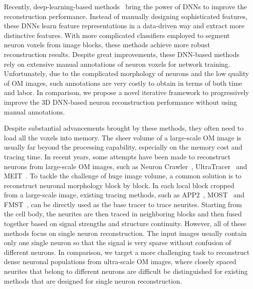Recently, deep-learning-based methods~\cite{Li2017, Zhou2018, Xu2016,Kozinski-MIA2020} bring the power of DNNs to improve the reconstruction performance. 
Instead of manually designing sophisticated features, these DNNs learn feature representations in a data-driven way and extract more distinctive features. 
With more complicated classifiers employed to segment neuron voxels from image blocks, these methods achieve more robust reconstruction results. 
Despite great improvements, these DNN-based methods rely on extensive manual annotations of neuron voxels for network training.
Unfortunately, due to the complicated morphology of neurons and the low quality of OM images, such annotations are very costly to obtain in terms of both time and labor.
%
In comparison, we propose a novel iterative framework to progressively improve the 3D DNN-based neuron reconstruction performance without using manual annotations.



Despite substantial advancements brought by these methods, they often need to load all the voxels into memory.
The sheer volume of a large-scale OM image is usually far beyond the processing capability, especially on the memory cost and tracing time.
%
In recent years, some attempts have been made to reconstruct neurons from large-scale OM images, such as Neuron Crawler~\cite{Zhou2015}, UltraTracer~\cite{Peng2017} and MEIT~\cite{Wang2018}.
To tackle the challenge of huge image volume, a common solution is to reconstruct neuronal morphology block by block. 
In each local block cropped from a large-scale image, existing tracing methods, such as APP2~\cite{Xiao2013}, MOST~\cite{Wu2014} and FMST~\cite{Yang2019}, can be directly used as the base tracer to trace neurites. 
Starting from the cell body, the neurites are then traced in neighboring blocks and then fused together based on signal strengths and structure continuity.
%
However, all of these methods focus on single neuron reconstruction.
The input images usually contain only one single neuron so that the signal is very sparse without confusion of different neurons. 
%
In comparison, we target a more challenging task to reconstruct dense neuronal populations from ultra-scale OM images, where closely spaced neurites that belong to different neurons are difficult be distinguished for existing methods that are designed for single neuron reconstruction.

